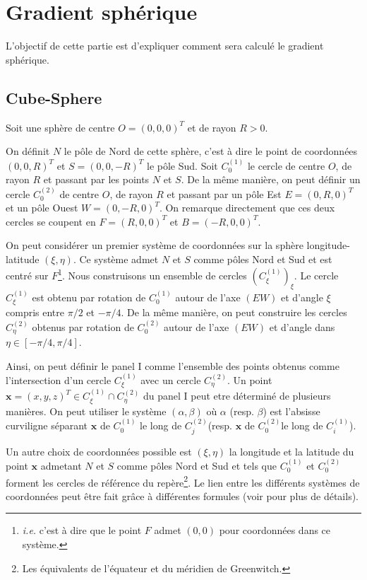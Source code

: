\section{Gradient sphérique}

L'objectif de cette partie est d'expliquer comment sera calculé le gradient sphérique.

\subsection{Cube-Sphere}

Soit une sphère de centre $O = (0,0,0)^T$ et de rayon $R > 0$. 

On définit $N$ le p\^ole de Nord de cette sphère, c'est à dire le point de coordonnées $(0,0,R)^T$ et $S = (0,0,-R)^T$ le p\^ole Sud. Soit $C^{(1)}_0$ le cercle de centre $O$, de rayon $R$ et passant par les points $N$ et $S$. De la m\^eme manière, on peut définir un cercle $C^{(2)}_0$ de centre $O$, de rayon $R$ et passant par un p\^ole Est $E = (0,R,0)^T$ et un p\^ole Ouest $W = (0,-R,0)^T$. On remarque directement que ces deux cercles se coupent en $F = (R,0,0)^T$ et $B=(-R,0,0)^T$.

On peut considérer un premier système de coordonnées sur la sphère longitude-latitude $(\xi, \eta)$. Ce système admet $N$ et $S$ comme p\^oles Nord et Sud et est centré sur $F$\footnote{\textit{i.e.} c'est à dire que le point $F$ admet $(0,0)$ pour coordonnées dans ce système.}.
Nous construisons un ensemble de cercles $\left( C^{(1)}_{\xi} \right)_{\xi}$. Le cercle $C^{(1)}_{\xi}$ est obtenu par rotation de $C^{(1)}_0$ autour de l'axe $(EW)$ et d'angle $\xi$ compris entre $\pi/2$ et $-\pi/4$. De la m\^eme manière, on peut construire les cercles $C^{(2)}_{\eta}$ obtenus par rotation de $C^{(2)}_0$ autour de l'axe $(EW)$ et d'angle dans $ \eta \in \left[ -\pi/4, \pi/4 \right]$.

Ainsi, on peut définir le panel I comme l'ensemble des points obtenus comme l'intersection d'un cercle $C^{(1)}_{\xi}$ avec un cercle $C^{(2)}_{\eta}$. Un point $\mathbf{x}=(x,y,z)^T \in C^{(1)}_{\xi} \cap C^{(2)}_{\eta}$ du panel I peut etre déterminé de plusieurs manières. On peut utiliser le système $(\alpha, \beta)$ où $\alpha$ (resp. $\beta$) est l'absisse curviligne séparant $\mathbf{x}$ de $C^{(1)}_0$ le long de $C^{(2)}_j$(resp. $\mathbf{x}$ de $C^{(2)}_0$le long de $C^{(1)}_i$).

Un autre choix de coordonnées possible est $(\xi, \eta)$ la longitude et la latitude du point $\mathbf{x}$ admetant $N$ et $S$ comme p\^oles Nord et Sud et tels que $C^{(1)}_0$ et $C^{(2)}_0$ forment les cercles de référence du repère\footnote{Les équivalents de l'équateur et du méridien de Greenwitch.}. Le lien entre les différents systèmes de coordonnées peut être fait grâce à différentes formules (voir \cite{Croisille2013} pour plus de détails).

